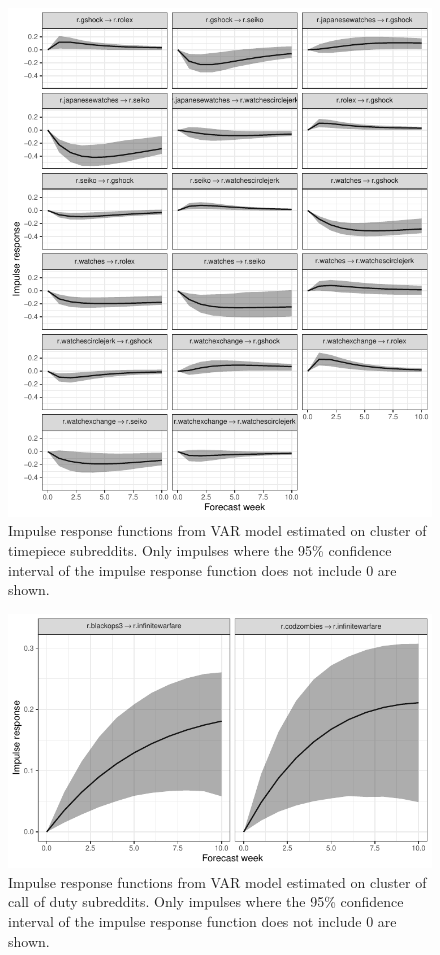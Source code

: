 \documentclass[manuscript]{acmart}\usepackage[]{graphicx}\usepackage[]{color}
\makeatletter
\def\maxwidth{ %
  \ifdim\Gin@nat@width>\linewidth
    \linewidth
  \else
    \Gin@nat@width
  \fi
}
\makeatother
\begin{document}
\begin{figure}
\centering

\includegraphics[width=\maxwidth]{figures/knitr-mixed_irf-1} 

\caption{Impulse response functions from VAR model estimated on cluster of timepiece subreddits. Only impulses where the 95\% confidence interval of the impulse response function does not include 0 are shown. \label{mixed.irf}}
\end{figure}

\begin{figure}
\centering

\includegraphics[width=\maxwidth]{figures/knitr-void_irf-1} 

\caption{Impulse response functions from VAR model estimated on cluster of call of duty subreddits. Only impulses where the 95\% confidence interval of the impulse response function does not include 0 are shown. \label{void.irf}}
\end{figure}
\end{document}
